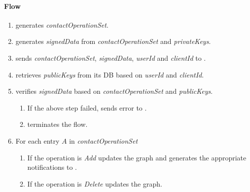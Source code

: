 \documentclass[a4paper,10pt,draft]{article}
\newcommand{\signedData}{\emph{signedData}}
\newcommand{\privateKeys}{\emph{privateKeys}}
\newcommand{\publicKeys}{\emph{publicKeys}}
\newcommand{\userId}{\emph{userId}}
\newcommand{\clientId}{\emph{clientId}}
\newcommand{\contactOperationSet}{\emph{contactOperationSet}}
\begin{document}
\paragraph{Flow}

\begin{enumerate}
 \item \Client{} generates \contactOperationSet{}.
 \item \Client{} generates \signedData{} from \contactOperationSet{} and \privateKeys{}.
 \item \Client{} sends \contactOperationSet{}, \signedData{}, \userId{} and \clientId{} to \Server{}.
 \item \Server{} retrieves \publicKeys{} from its DB based on \userId{} and 
\clientId{}.
 \item \Server{} verifies \signedData{} based on \contactOperationSet{} and \publicKeys{}.
 \begin{enumerate}
  \item If the above step failed, \Server{} sends error to \Client{}.
  \item \Client{} terminates the flow.
 \end{enumerate}
 \item For each entry $A$ in \contactOperationSet{}
 \begin{enumerate}
  \item If the operation is {\em Add} \Server{} updates the graph and generates the appropriate notifications to \Client{}.
  \item If the operation is {\em Delete} \Server{} updates the graph.
 \end{enumerate}
\end{enumerate}



\end{document}
